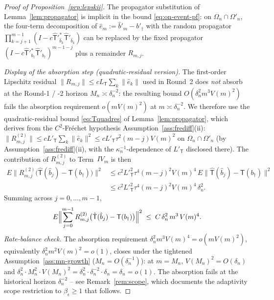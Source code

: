 \begin{proof}[Proof of Proposition~\ref{prp:lepskii}]
The propagator substitution of Lemma~\ref{lem:propagator} %
is implicit in the bound \eqref{eq:on-event-pf}: on $\Omega_n \cap
\Omega'_n$, the four-term decomposition of $\hat e_m := \hat b'_m -
b'_\dagger$ with the random propagator
$\prod_{k=j+1}^{m-1}(I - c\hat{\mathsf T}'^*_{\hat b_k}\hat{\mathsf T}'_{\hat b_k})$
can be replaced by the fixed propagator
$(I - c\hat{\mathsf T}'^*_{b_\dagger}\hat{\mathsf T}'_{b_\dagger})^{m-1-j}$ plus a
remainder $R_{m,j}$.

\emph{Display of the absorption step (quadratic-residual version).}
The first-order Lipschitz residual
$\|R_{m,j}\| \le cL_{\mathsf T}\sum_k\|\hat e_k\|$ used in Round~2 does
\emph{not} absorb at the Round-1 / -2 horizon $M_n \asymp \delta_n^{-2}$:
the resulting bound $O(\delta_n^{2}m^{3}V(m)^{2})$ fails the absorption
requirement $o(mV(m)^{2})$ at $m \asymp \delta_n^{-2}$. We therefore use
the quadratic-residual bound \eqref{eq:Tquadres} of
Lemma~\ref{lem:propagator}, which derives from the $C^2$-Fr\'echet
hypothesis Assumption~\ref{ass:frediff}\textup{(ii)}:
$\|R^{(2)}_{m,j}\| \le c L'_{\mathsf T}\sum_k\|\hat e_k\|^{2}
\le c L'_{\mathsf T}\tau^{2}(m-j)V(m)^{2}$ on $\Omega_n \cap \Omega'_n$
(by Assumption~\ref{ass:frediff}\textup{(ii)}, with the
$\kappa_n^{-1}$-dependence of $L'_{\mathsf T}$ disclosed there).
The contribution of $R^{(2)}_{m,j}$ to Term~$IV_m$ is then
\begin{align*}
E\bigl\|R^{(2)}_{m,j}\bigl(\hat{\mathsf T}(\hat b_j) - \mathsf T(b_\dagger)\bigr)\bigr\|^{2}
&\le c^{2}L'^{2}_{\mathsf T}\tau^{4}(m-j)^{2}V(m)^{4}\,
   E\|\hat{\mathsf T}(\hat b_j) - \mathsf T(b_\dagger)\|^{2}\\
&\le c^{2}L'^{2}_{\mathsf T}\tau^{4}(m-j)^{2}V(m)^{4}\,\delta_n^{2}.
\end{align*}
Summing across $j = 0, \ldots, m-1$,
\begin{equation}\label{eq:Rabsorb-pf}
E\Bigl\|\sum_{j=0}^{m-1}R^{(2)}_{m,j}\bigl(\hat{\mathsf T}(\hat b_j) - \mathsf T(b_\dagger)\bigr)\Bigr\|^{2}
\;\le\; C\,\delta_n^{2}\,m^{3}\,V(m)^{4}.
\end{equation}
\emph{Rate-balance check.} The absorption requirement
$\delta_n^{2}m^{3}V(m)^{4} = o(mV(m)^{2})$, equivalently
$\delta_n^{2}m^{2}V(m)^{2} = o(1)$, closes under the tightened
Assumption~\ref{ass:mn-growth} ($M_n = O(\delta_n^{-1})$): at
$m = M_n$, $V(M_n)^{2} = O(\delta_n)$ and
$\delta_n^{2}\cdot M_n^{2}\cdot V(M_n)^{2} = \delta_n^{2}\cdot\delta_n^{-2}\cdot\delta_n
= \delta_n = o(1)$. The absorption fails at the historical horizon
$\delta_n^{-2}$ -- see Remark~\ref{rem:scope}, which documents the
adaptivity scope restriction to $\beta_\epsilon \ge 1$ that follows.


\end{proof}
